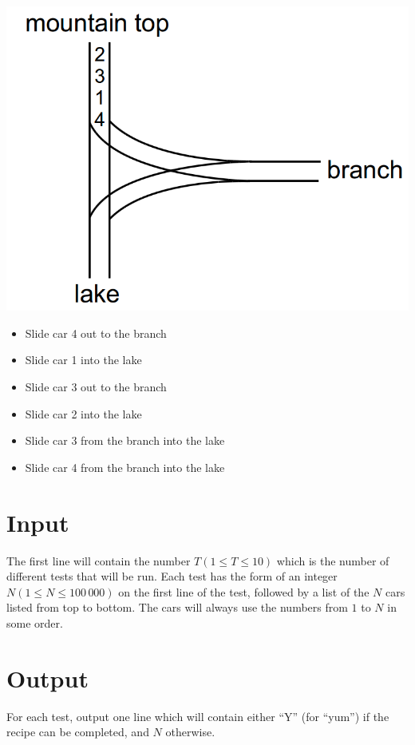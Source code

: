 \begin{minipage}{0.45\linewidth}
  \includegraphics[width=\linewidth]{confection2}
\end{minipage}
\hspace{0.05\linewidth}
\begin{minipage}{0.45\linewidth}
 \begin{itemize}
    \item Slide car 4 out to the branch
    \item Slide car 1 into the lake
    \item Slide car 3 out to the branch
    \item Slide car 2 into the lake
    \item Slide car 3 from the branch into the lake
    \item Slide car 4 from the branch into the lake
  \end{itemize}
\end{minipage}

\section*{Input}
The first line will contain the number $T (1 \leq T \leq 10)$ which is the number of different tests
that will be run. Each test has the form of an integer $N (1 \leq N \leq 100\,000)$ on the first
line of the test, followed by a list of the $N$ cars listed from top to bottom. The cars will always
use the numbers from $1$ to $N$ in some order.

\section*{Output}
For each test, output one line which will contain either ``Y'' (for ``yum'') if the recipe can be
completed, and $N$ otherwise.

